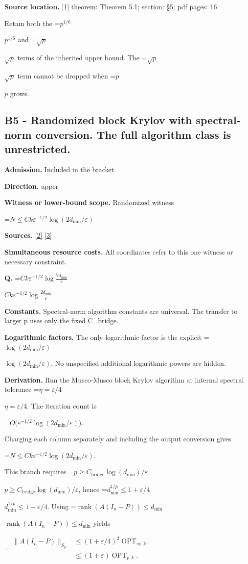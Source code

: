 \documentclass[10pt,a4paper]{article}
\newcommand{\AtlasMath}[1]{\par\begingroup\centering\setbox0=\hbox{$\displaystyle #1$}\ifdim\wd0>1.4\linewidth\typeout{ATLAS WIDE FORMULA: \the\wd0}\fi\ifdim\wd0>\linewidth\resizebox{\linewidth}{!}{\box0}\else\box0\fi\par\endgroup}
\newcommand{\AtlasInlineMath}[1]{\begingroup\setbox0=\hbox{$#1$}\ifdim\wd0>.4\linewidth\endgroup\AtlasMath{#1}\else\endgroup$#1$\fi}
\begin{document}
\textbf{Source location.} \href{https://arxiv.org/pdf/2202.05120v4}{[1]} theorem: Theorem 5.1; section: §5; pdf pages: 16

Retain both the \AtlasInlineMath{p^{1/6}} and \AtlasInlineMath{\sqrt p} terms of the inherited upper bound. The \AtlasInlineMath{\sqrt p} term cannot be dropped when \AtlasInlineMath{p} grows.

\subsection{B5 - Randomized block Krylov with spectral-norm conversion. The full algorithm class is unrestricted.}
\textbf{Admission.} Included in the bracket

\textbf{Direction.} upper

\textbf{Witness or lower-bound scope.} Randomized witness

\AtlasMath{N\le Ck\varepsilon^{-1/2}\log(2d_{\mathrm{min}}/\varepsilon)}
\textbf{Sources.} \href{https://arxiv.org/pdf/2609.35840v2}{[2]} \href{https://arxiv.org/pdf/1504.05477v4}{[3]}

\textbf{Simultaneous resource costs.} All coordinates refer to this one witness or necessary constraint.

\textbf{Q.} \AtlasInlineMath{Ck\varepsilon^{-1/2}\log\!\frac{2d_{\mathrm{min}}}{\varepsilon}}

\textbf{Constants.} Spectral-norm algorithm constants are universal. The transfer to larger p uses only the fixed C\_bridge.

\textbf{Logarithmic factors.} The only logarithmic factor is the explicit \AtlasInlineMath{\log(2d_{\mathrm{min}}/\varepsilon)}. No unspecified additional logarithmic powers are hidden.

\textbf{Derivation.} Run the Musco-Musco block Krylov algorithm at internal spectral tolerance \AtlasInlineMath{\eta=\varepsilon/4}. The iteration count is 
\AtlasMath{O\bigl(\varepsilon^{-1/2}\log(2d_{\mathrm{min}}/\varepsilon)\bigr).}
 Charging each column separately and including the output conversion gives 
\AtlasMath{N\le Ck\varepsilon^{-1/2}\log(2d_{\mathrm{min}}/\varepsilon).}
 This branch requires \AtlasInlineMath{p\ge C_{\mathrm{bridge}}\log(d_{\mathrm{min}})/\varepsilon}, hence \AtlasInlineMath{d_{\mathrm{min}}^{1/p}\le1+\varepsilon/4}. Using \AtlasInlineMath{\operatorname{rank}(A(I_n-P))\le d_{\mathrm{min}}} yields 
\AtlasMath{\begin{aligned}
\|A(I_n-P)\|_{S_p}
&\le(1+\varepsilon/4)^2\operatorname{OPT}_{\infty,k}\\
&\le(1+\varepsilon)\operatorname{OPT}_{p,k}.
\end{aligned}}
\end{document}
